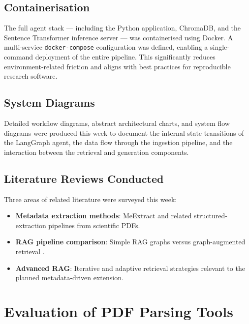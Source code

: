 \documentclass[12pt, a4paper]{article}
\begin{document}
\subsection{Containerisation}

The full agent stack --- including the Python application, ChromaDB, and
the Sentence Transformer inference server --- was containerised using
Docker. A multi-service \texttt{docker-compose} configuration was defined,
enabling a single-command deployment of the entire pipeline. This
significantly reduces environment-related friction and aligns with
best practices for reproducible research software.

\subsection{System Diagrams}

Detailed workflow diagrams, abstract architectural charts, and system
flow diagrams were produced this week to document the internal state
transitions of the LangGraph agent, the data flow through the ingestion
pipeline, and the interaction between the retrieval and generation
components.

\subsection{Literature Reviews Conducted}

Three areas of related literature were surveyed this week:

\begin{itemize}[leftmargin=*]
    \item \textbf{Metadata extraction methods}: MeExtract and related
          structured-extraction pipelines from scientific PDFs.
    \item \textbf{RAG pipeline comparison}: Simple RAG graphs versus
          graph-augmented retrieval \cite{edge2024graphrag}.
    \item \textbf{Advanced RAG}: Iterative and adaptive retrieval
          strategies relevant to the planned metadata-driven extension.
\end{itemize}

\section{Evaluation of PDF Parsing Tools}
\label{sec:eval}
\end{document}
